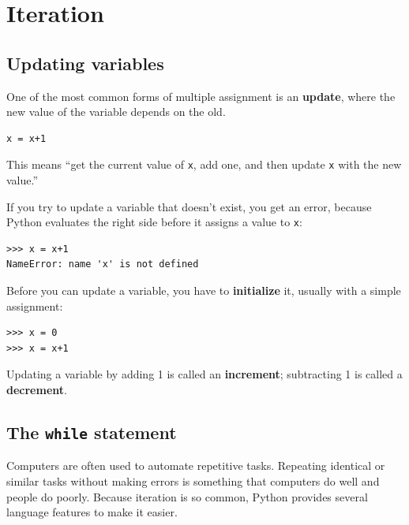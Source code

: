 \documentclass[10pt]{book}
\begin{document}
\chapter{Iteration}


\section{Updating variables}
\label{update}


One of the most common forms of multiple assignment is an {\bf update},
where the new value of the variable depends on the old.

\beforeverb
\begin{verbatim}
x = x+1
\end{verbatim}
\afterverb
%
This means ``get the current value of {\tt x}, add one, and then
update {\tt x} with the new value.''

If you try to update a variable that doesn't exist, you get an
error, because Python evaluates the right side before it assigns
a value to {\tt x}:

\beforeverb
\begin{verbatim}
>>> x = x+1
NameError: name 'x' is not defined
\end{verbatim}
\afterverb
%
Before you can update a variable, you have to {\bf initialize}
it, usually with a simple assignment:


\beforeverb
\begin{verbatim}
>>> x = 0
>>> x = x+1
\end{verbatim}
\afterverb
%
Updating a variable by adding 1 is called an {\bf increment};
subtracting 1 is called a {\bf decrement}.





\section{The {\tt while} statement}


Computers are often used to automate repetitive tasks.  Repeating
identical or similar tasks without making errors is something that
computers do well and people do poorly.
Because iteration is so common, Python provides several
language features to make it easier.  
\end{document}
